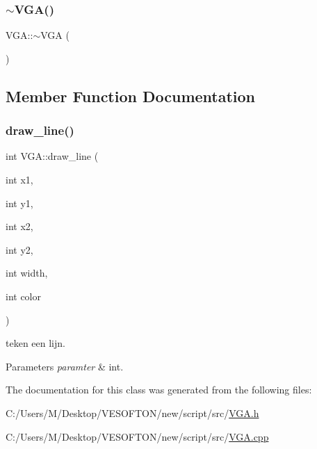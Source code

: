 \mbox{\label{class_v_g_a_a668d9721425a9cae546a822ae6eeb586}} 
\subsubsection{\texorpdfstring{$\sim$\+V\+G\+A()}{~VGA()}}
{\footnotesize\ttfamily V\+G\+A\+::$\sim$\+V\+GA (\begin{DoxyParamCaption}{ }\end{DoxyParamCaption})\hspace{0.3cm}{\ttfamily [virtual]}}



\subsection{Member Function Documentation}
\mbox{\label{class_v_g_a_abc1cae8d5ea46f564874e3061fc95964}} 
\subsubsection{\texorpdfstring{draw\+\_\+line()}{draw\_line()}}
{\footnotesize\ttfamily int V\+G\+A\+::draw\+\_\+line (\begin{DoxyParamCaption}\item[{int}]{x1,  }\item[{int}]{y1,  }\item[{int}]{x2,  }\item[{int}]{y2,  }\item[{int}]{width,  }\item[{int}]{color }\end{DoxyParamCaption})}



teken een lijn. 


\begin{DoxyParams}{Parameters}
{\em paramter} & int. \\
\hline
\end{DoxyParams}


The documentation for this class was generated from the following files\+:\begin{DoxyCompactItemize}
\item 
C\+:/\+Users/\+M/\+Desktop/\+V\+E\+S\+O\+F\+T\+O\+N/new/script/src/\mbox{\hyperlink{_v_g_a_8h}{V\+G\+A.\+h}}\item 
C\+:/\+Users/\+M/\+Desktop/\+V\+E\+S\+O\+F\+T\+O\+N/new/script/src/\mbox{\hyperlink{_v_g_a_8cpp}{V\+G\+A.\+cpp}}\end{DoxyCompactItemize}
